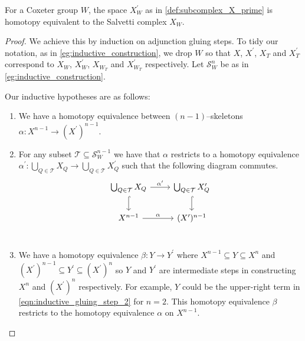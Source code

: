 \documentclass[class=article, crop=false]{standalone}
\begin{document}
\begin{theorem}
    \label{thm:salvetti_cx_equiv_X_prime}
    For a Coxeter group $W$, the space $X^\prime_W$ as in \cref{def:subcomplex_X_prime} is homotopy equivalent to the Salvetti complex $X_W$. 
\end{theorem}
\begin{proof}
    We achieve this by induction on adjunction gluing steps. To tidy our notation, as in \cref{eg:inductive_construction}, we drop $W$ so that $X$, $X^\prime$, $X_T$ and $X^\prime_T$ correspond to $X_W$, $X^\prime_W$, $X_{W_T}$ and $X^\prime_{W_T}$ respectively. Let $\mathcal{S}_W^n$ be as in \cref{eg:inductive_construction}.

    Our inductive hypotheses are as follows:

    \begin{enumerate}
        \item We have a homotopy equivalence between $(n-1)$--skeletons $\alpha \colon X^{n-1} \to (X^\prime)^{n-1}$.
        \item For any subset $\mathcal{T} \subseteq \mathcal{S}_W^{n-1}$ we have that $\alpha$ restricts to a homotopy equivalence $\alpha^\prime \colon \bigcup_{Q \in \mathcal{T}}X_Q \to \bigcup_{Q \in \mathcal{T}}X^\prime_Q$ such that the following diagram commutes.
        \begin{equation*}
            \begin{tikzcd}
    \bigcup_{Q \in \mathcal{T}} X_{Q} \ar[r, "\alpha^\prime" ] \ar[d, hookrightarrow]     &   \bigcup_{Q \in \mathcal{T}} X^\prime_{Q}  \ar[d, hookrightarrow]       \\
    X^{n-1}  \ar[r, "\alpha"]                                                                 &   (X^\prime)^{n-1}                                                  \\
            \end{tikzcd}
            \label{eqn:commutative_skeleton_inductive_hyp}  
        \end{equation*}
        \item We have a homotopy equivalence $\beta \colon Y \to Y^\prime$ where $X^{n-1} \subseteq Y \subseteq X^n$ and $(X^\prime)^{n-1} \subseteq Y^\prime \subseteq (X^\prime)^n$ so $Y$ and $Y^\prime$ are intermediate steps in constructing $X^n$ and $(X^\prime)^n$ respectively. For example, $Y$ could be the upper-right term in \eqref{eqn:inductive_gluing_step_2} for $n=2$. This homotopy equivalence $\beta$ restricts to the homotopy equivalence $\alpha$ on $X^{n-1}$.
    \end{enumerate}


\end{proof}
\end{document}
